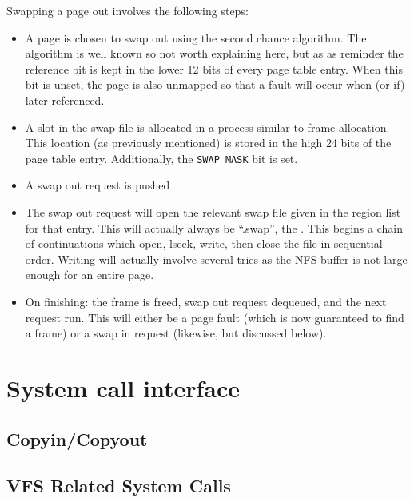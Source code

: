 \documentclass[12pt,english]{article}
\begin{document}
Swapping a page out involves the following steps:
\begin{itemize}
\item A page is chosen to swap out using the second chance algorithm.  The algorithm is well known so not worth explaining here, but as as reminder the reference bit is kept in the lower 12 bits of every page table entry.  When this bit is unset, the page is also unmapped so that a fault will occur when (or if) later referenced.
\item A slot in the swap file is allocated in a process similar to frame allocation.  This location (as previously mentioned) is stored in the high 24 bits of the page table entry.  Additionally, the \texttt{SWAP\_MASK} bit is set.
\item A swap out request is pushed 
\item The swap out request will open the relevant swap file given in the region list for that entry.  This will actually always be ``.swap'', the .  This begins a chain of continuations which open, lseek, write, then close the file in sequential order.  Writing will actually involve several tries as the NFS buffer is not large enough for an entire page.
\item On finishing: the frame is freed, swap out request dequeued, and the next request run.  This will either be a page fault (which is now guaranteed to find a frame) or a swap in request (likewise, but discussed below).
\end{itemize}



\section{System call interface}

\subsection{Copyin/Copyout}

\subsection{VFS Related System Calls} \label{syscalls:vfs}
\end{document}
